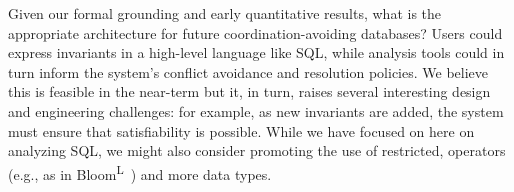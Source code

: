  Given our formal grounding and early
quantitative results, what is the appropriate architecture for future
coordination-avoiding databases? Users could express invariants in a
high-level language like SQL, while analysis tools could in turn
inform the system's conflict avoidance and resolution policies. We
believe this is feasible in the near-term but it, in turn, raises
several interesting design and engineering challenges: for example, as
new invariants are added, the system must ensure that satisfiability
is possible. While we have focused on here on analyzing SQL, we might
also consider promoting the use of restricted, \iconfluent operators
(e.g., as in Bloom\textsuperscript{L}~\cite{blooml}) and more data
types.

